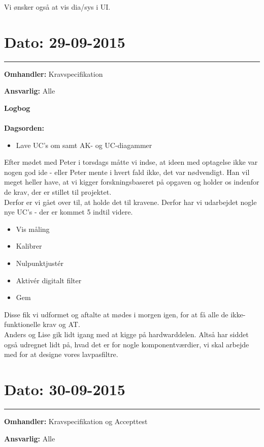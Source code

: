 Vi ønsker også at vis dia/sys i UI. 


	

\section{Dato: 29-09-2015 }
\hrule

\textbf{Omhandler:} Kravspecifikation 

\textbf{Ansvarlig:} Alle 

\textbf{Logbog}
\\
\\
\textbf{Dagsorden:}
\begin{itemize}
\item Lave UC's om samt AK- og UC-diagammer
\end{itemize}

Efter mødet med Peter i torsdags måtte vi indse, at ideen med optagelse ikke var nogen god ide - eller Peter mente i hvert fald ikke, det var nødvendigt. Han vil meget heller have, at vi kigger forskningsbaseret på opgaven og holder os indenfor de krav, der er stillet til projektet.\\
Derfor er vi gået over til, at holde det til kravene. Derfor har vi udarbejdet nogle nye UC's - der er kommet 5 indtil videre. 
\begin{itemize}
	\item Vis måling 
	\item Kalibrer
	\item Nulpunktjustér 
	\item Aktivér digitalt filter
	\item Gem 
\end{itemize}

Disse fik vi udformet og aftalte at mødes i morgen igen, for at få alle de ikke-funktionelle krav og AT. 
\\
Anders og Lise gik lidt igang med at kigge på hardwarddelen. Altså har siddet også udregnet lidt på, hvad det er for nogle komponentværdier, vi skal arbejde med for at designe vores lavpasfiltre.  


	
	
\section{Dato: 30-09-2015 }
\hrule

\textbf{Omhandler:} Kravspecifikation og Accepttest  

\textbf{Ansvarlig:} Alle 

